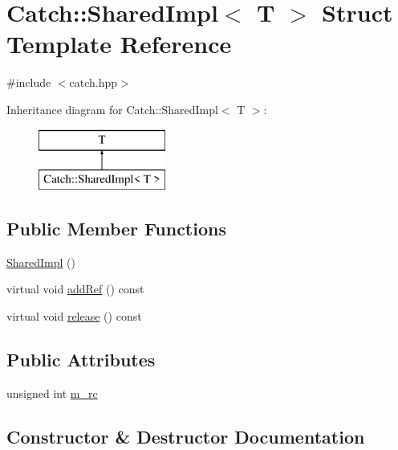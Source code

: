 \hypertarget{struct_catch_1_1_shared_impl}{}\section{Catch\+:\+:Shared\+Impl$<$ T $>$ Struct Template Reference}
\label{struct_catch_1_1_shared_impl}


{\ttfamily \#include $<$catch.\+hpp$>$}

Inheritance diagram for Catch\+:\+:Shared\+Impl$<$ T $>$\+:\begin{figure}[H]
\begin{center}
\leavevmode
\includegraphics[height=2.000000cm]{struct_catch_1_1_shared_impl}
\end{center}
\end{figure}
\subsection*{Public Member Functions}
\begin{DoxyCompactItemize}
\item 
\mbox{\hyperlink{struct_catch_1_1_shared_impl_a0629856ee353298b61ad52cf60e716fb}{Shared\+Impl}} ()
\item 
virtual void \mbox{\hyperlink{struct_catch_1_1_shared_impl_a5d1a4c96e8fc07c821890fd09749062e}{add\+Ref}} () const
\item 
virtual void \mbox{\hyperlink{struct_catch_1_1_shared_impl_ada8052c6f24fd73ec099333626f106fe}{release}} () const
\end{DoxyCompactItemize}
\subsection*{Public Attributes}
\begin{DoxyCompactItemize}
\item 
unsigned int \mbox{\hyperlink{struct_catch_1_1_shared_impl_a7e71ef1985b85aa41a1632f932a96bcb}{m\+\_\+rc}}
\end{DoxyCompactItemize}


\subsection{Constructor \& Destructor Documentation}
\mbox{\label{struct_catch_1_1_shared_impl_a0629856ee353298b61ad52cf60e716fb}} 
